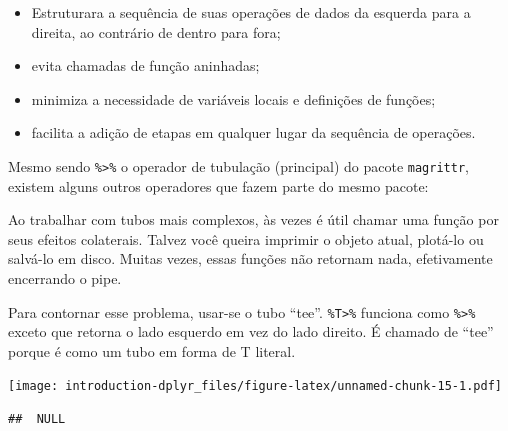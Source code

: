 \documentclass[]{book}
\newenvironment{Shaded}{\begin{snugshade}}{\end{snugshade}}
\newcommand{\DataTypeTok}[1]{\textcolor[rgb]{0.13,0.29,0.53}{#1}}
\newcommand{\DecValTok}[1]{\textcolor[rgb]{0.00,0.00,0.81}{#1}}
\newcommand{\KeywordTok}[1]{\textcolor[rgb]{0.13,0.29,0.53}{\textbf{#1}}}
\newcommand{\NormalTok}[1]{#1}
\newcommand{\OperatorTok}[1]{\textcolor[rgb]{0.81,0.36,0.00}{\textbf{#1}}}
\newcommand{\StringTok}[1]{\textcolor[rgb]{0.31,0.60,0.02}{#1}}
\begin{document}
\begin{itemize}
\item
  Estruturara a sequência de suas operações de dados da esquerda para a direita, ao contrário de dentro para fora;
\item
  evita chamadas de função aninhadas;
\item
  minimiza a necessidade de variáveis locais e definições de funções;
\item
  facilita a adição de etapas em qualquer lugar da sequência de operações.
\end{itemize}

Mesmo sendo \texttt{\%\textgreater{}\%} o operador de tubulação (principal) do pacote \texttt{magrittr}, existem alguns outros operadores que fazem parte do mesmo pacote:

Ao trabalhar com tubos mais complexos, às vezes é útil chamar uma função por seus efeitos colaterais. Talvez você queira imprimir o objeto atual, plotá-lo ou salvá-lo em disco. Muitas vezes, essas funções não retornam nada, efetivamente encerrando o pipe.

Para contornar esse problema, usar-se o tubo ``tee''. \texttt{\%T\textgreater{}\%} funciona como \texttt{\%\textgreater{}\%} exceto que retorna o lado esquerdo em vez do lado direito. É chamado de ``tee'' porque é como um tubo em forma de T literal.

\begin{Shaded}
\end{Shaded}

\texttt{[image: introduction-dplyr\_files/figure-latex/unnamed-chunk-15-1.pdf]}

\begin{verbatim}
##  NULL
\end{verbatim}

\begin{Shaded}
\end{Shaded}
\end{document}
